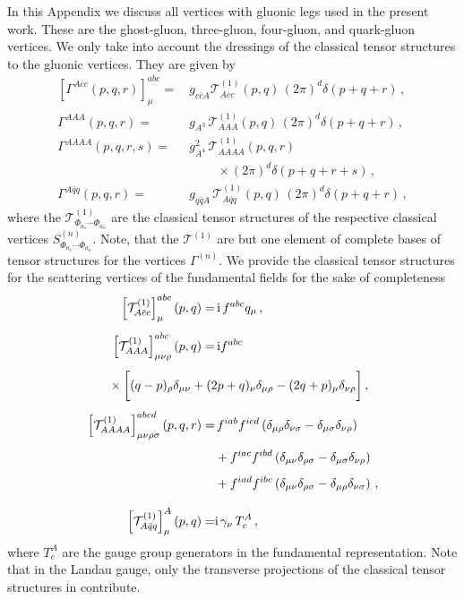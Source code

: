 \documentclass[aps,twocolumn,prd,superscriptaddress]{revtex4-2}
\begin{document}
In this Appendix we discuss all vertices with gluonic legs used in the present work. These are the ghost-gluon, three-gluon, four-gluon, and quark-gluon vertices. We only take into account the dressings of the classical tensor structures to the gluonic vertices. They are given by
%
\begin{align}\nonumber
		[\Gamma^{A\bar{c}c}(p,q,r)]^{abc}_\mu  =&\, 
	g_{c\bar{c}A} \mathcal{T}_{A\bar{c}c}^{(1)}(p,q) \,  (2\pi)^d\delta(p+q+r)\,,\\[1ex]\nonumber  
	\Gamma^{AAA}(p,q,r)                   = &\, g_{A^3}\,\mathcal{T}^{(1)}_{AAA}(p,q)\,(2\pi)^d\delta(p+q+r)\,,\\[1ex]\nonumber 
	\Gamma^{AAAA}(p,q,r,s)                 =&\, g_{A^4}^2\,\mathcal{T}^{(1)}_{AAAA}(p,q,r) \\[1ex]\nonumber &\hspace{1cm}\times (2\pi)^d\delta(p+q+r+s)\,,
\\[2ex]
	\Gamma^{A\bar{q}q}(p,q,r)             =&\, g_{q\bar{q}A} \, \mathcal{T}_{A\bar{q}q}^{(1)}(p,q)\, (2\pi)^d\delta(p+q+r) 
	\,,
\end{align}
%
where the $\mathcal{T}_{\Phi_{a_1}\cdots \Phi_{a_n}}^{(1)}$ are the classical tensor structures of the respective classical vertices $S_{\Phi_{a_1}\cdots \Phi_{a_n}}^{(n)}$. Note, that the $\mathcal{T}^{(1)}$ are but one element of complete bases of tensor structures for the vertices $\Gamma^{(n)}$. We provide the classical tensor structures for the scattering vertices of the fundamental fields for the sake of completeness
%
\begin{align}\nonumber 	
\left[\mathcal{T}_{A\bar{c}c}^{(1)}\right]^{abc}_\mu(p,q) =&\, 	{\textrm{i}}\,f^{abc} q_\mu \,,\\[1ex] \nonumber 
	\left[\mathcal{T}_{AAA}^{(1)}\right]^{abc}_{\mu\nu\rho}(p,q)           =&\, {\textrm{i}} f^{abc}
	  \\[1ex]\nonumber 
	 &\hspace{-3cm}\times\bigg[(q-p)_\rho\delta_{\mu\nu} + (2 p+q)_\nu\delta_{\mu\rho} - (2 q+p)_\mu\delta_{\nu\rho}\bigg] \,,
	 \\[1ex]\nonumber 
	\left[\mathcal{T}_{AAAA}^{(1)}\right]^{abcd}_{\mu\nu\rho\sigma}(p,q,r)  =& \,
	f^{iab}f^{icd}\left(\delta_{\mu\rho}\delta_{\nu\sigma}-\delta_{\mu\sigma}\delta_{\nu\rho}\right)  \\[1ex]\nonumber 
	&
	+f^{iac}f^{ibd}\left(\delta_{\mu\nu}\delta_{\rho\sigma}-\delta_{\mu\sigma}\delta_{\nu\rho}\right)
	 \\[1ex]\nonumber 
	 &
	+f^{iad}f^{ibc}\left(\delta_{\mu\nu}\delta_{\rho\sigma}-\delta_{\mu\rho}\delta_{\nu\sigma}\right) \,,
	 \\[2ex]
	\left[\mathcal{T}_{A\bar{q}q}^{(1)}\right]^A_\mu(p,q) =& \textrm{i}\,\gamma_\nu\, T_c^A\,, 
\label{eq:classicalTensorsGluon}
\end{align}
%
where $T^A_c$ are the gauge group generators in the fundamental representation. 
Note that in the Landau gauge, only the transverse projections of the classical tensor structures in  contribute. 
 
\end{document}
